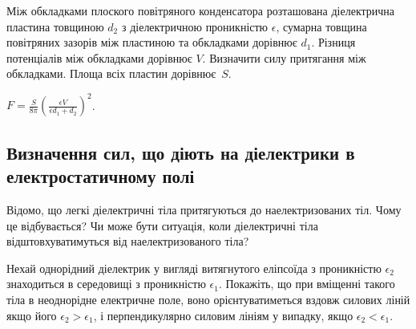 \begin{problem}
Між обкладками плоского повітряного конденсатора розташована діелектрична пластина товщиною $d_2$ з діелектричною проникністю $\epsilon$, сумарна товщина повітряних зазорів між пластиною та обкладками дорівнює $d_1$. Різниця потенціалів між обкладками дорівнює $V$. Визначити силу притягання між обкладками. Площа всіх пластин дорівнює~$S$.
\begin{solution}
	$ F = \frac{S}{8\pi} \left( \frac{\epsilon V}{ \epsilon d_1 + d_2} \right)^2 $.
\end{solution}
\end{problem}

\subsection*{Визначення сил, що діють на діелектрики в електростатичному полі}

\begin{problem}
    Відомо, що легкі діелектричні тіла притягуються до наелектризованих тіл. Чому це відбувається? Чи може бути ситуація, коли діелектричні тіла відштовхуватимуться від наелектризованого тіла?
\end{problem}

\begin{problem}
	Нехай однорідний діелектрик у вигляді витягнутого еліпсоїда з проникністю $\epsilon_2$ знаходиться в середовищі з проникністю $\epsilon_1$. Покажіть, що при вміщенні такого тіла в неоднорідне електричне поле, воно орієнтуватиметься вздовж силових ліній якщо його $\epsilon_2 > \epsilon_1$, і перпендикулярно силовим лініям у випадку, якщо $\epsilon_2 < \epsilon_1$.
\end{problem}

